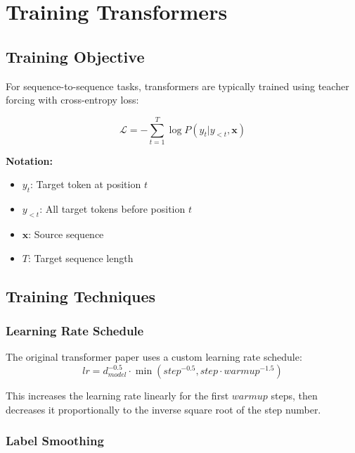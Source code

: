 \documentclass[11pt]{article}
\begin{document}
\section{Training Transformers}

\subsection{Training Objective}

For sequence-to-sequence tasks, transformers are typically trained using teacher forcing with cross-entropy loss:

\begin{equation}
\mathcal{L} = -\sum_{t=1}^{T} \log P(y_t | y_{<t}, \mathbf{x})
\end{equation}
\begin{notationbox}
\textbf{Notation:}
\begin{itemize}
    \item $y_t$: Target token at position $t$
    \item $y_{<t}$: All target tokens before position $t$
    \item $\mathbf{x}$: Source sequence
    \item $T$: Target sequence length
\end{itemize}
\end{notationbox}

\subsection{Training Techniques}

\subsubsection{Learning Rate Schedule}

The original transformer paper uses a custom learning rate schedule:
\begin{equation}
lr = d_{model}^{-0.5} \cdot \min(step^{-0.5}, step \cdot warmup^{-1.5})
\end{equation}

This increases the learning rate linearly for the first $warmup$ steps, then decreases it proportionally to the inverse square root of the step number.

\subsubsection{Label Smoothing}
\end{document}
